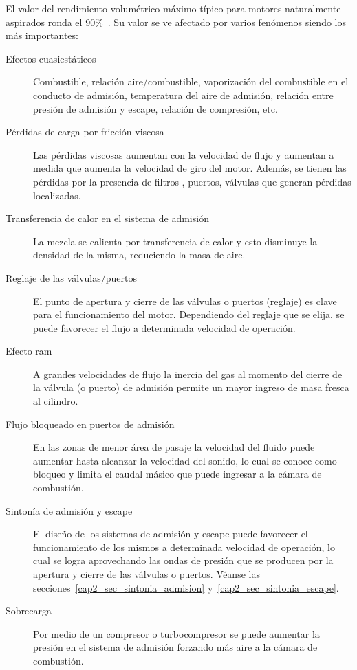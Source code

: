 El valor del rendimiento volumétrico máximo típico para motores naturalmente
aspirados ronda el 90\%~\parencite{heywood}.
%
Su valor se ve afectado por varios fenómenos siendo los más importantes:

\begin{description}
    \item [Efectos cuasiestáticos] Combustible, relación aire/combustible,
vaporización del combustible en el conducto de admisión, temperatura del aire de
admisión, relación entre presión de admisión y escape, relación de compresión,
etc.
  \item [Pérdidas de carga por fricción viscosa] Las pérdidas viscosas aumentan
con la velocidad de flujo y aumentan a medida que aumenta la velocidad de giro
del motor.
Además, se tienen las pérdidas por la presencia de filtros , puertos, válvulas
que generan pérdidas localizadas.
  \item [Transferencia de calor en el sistema de admisión] La mezcla se calienta
por transferencia de calor y esto disminuye la densidad de la misma, reduciendo
la masa de aire.
  \item [Reglaje de las válvulas/puertos] El punto de apertura y cierre de las
válvulas o  puertos (reglaje) es clave para el funcionamiento del motor.
Dependiendo del reglaje que se elija, se puede favorecer el flujo a determinada
velocidad de operación.
    \item [Efecto ram] A grandes velocidades de flujo la inercia del gas al
momento del cierre de la válvula (o puerto) de admisión permite un mayor ingreso
de masa fresca al cilindro.
    \item [Flujo bloqueado en puertos de admisión] En las zonas de
menor área de pasaje la velocidad del fluido puede aumentar hasta alcanzar la
velocidad del sonido, lo cual se conoce como bloqueo y limita el caudal másico que
puede ingresar a la cámara de combustión.
    \item [Sintonía de admisión y escape] El diseño de los sistemas de
admisión y escape puede favorecer el funcionamiento de los mismos a determinada
velocidad de operación, lo cual se logra aprovechando las ondas de presión que
se producen por la apertura y cierre de las válvulas o puertos.
Véanse las secciones~\ref{cap2_sec_sintonia_admision} y~\ref{cap2_sec_sintonia_escape}.
  \item [Sobrecarga] Por medio de un compresor o turbocompresor se puede
aumentar la presión en el sistema de admisión forzando más aire a la cámara de
combustión.
\end{description}

